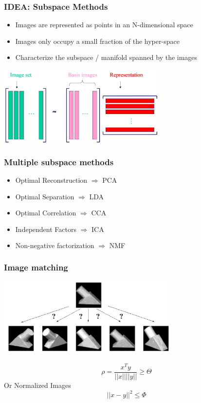 \documentclass[10pt]{beamer}
\begin{document}
\begin{frame}
  \frametitle{IDEA: Subspace Methods}
  \begin{itemize}
  \item Images are represented as points in an N-dimensional space
  \item Images only occupy a small fraction of the hyper-space
  \item Characterize the subspace / manifold spanned by the images
  \end{itemize}
  \centerline{\includegraphics[height=4cm]{subspace-sketch}}
\end{frame}

\begin{frame}
  \frametitle{Multiple subspace methods}
  \begin{itemize}
  \item Optimal Reconstruction $\Rightarrow$ PCA
  \item Optimal Separation $\Rightarrow$ LDA
  \item Optimal Correlation $\Rightarrow$ CCA
  \item Independent Factors $\Rightarrow$ ICA
  \item Non-negative factorization $\Rightarrow$ NMF
  \end{itemize}
\end{frame}

\begin{frame}
  \frametitle{Image matching}
  \centerline{\includegraphics[height=4cm]{image-matching}}
  \[
    \rho = \frac{x^T y}{||x|| ||y||} \geq \Theta
  \]
  Or Normalized Images
  \[
    || x - y ||^2 \leq \Phi
  \]
\end{frame}
\end{document}
